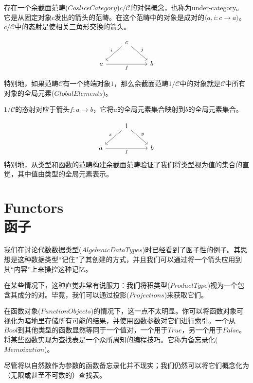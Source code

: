 \documentclass[DaoFP]{subfiles}
\begin{document}
    存在一个余截面范畴($Coslice Category$)$c / \mathcal{C}$的对偶概念，也称为under-category。它是从固定对象$c$发出的箭头的范畴。在这个范畴中的对象是成对的$\langle a, i \colon c \to a \rangle$。$c / \mathcal{C}$中的态射是使相关三角形交换的箭头。

    \[
        \begin{tikzcd}
            & c
            \arrow[rd, "j"]
            \arrow[ld, "i"']
            \\
            a
            \arrow[rr, "f"']
            && b
        \end{tikzcd}
    \]

    特别地，如果范畴$\mathcal{C}$有一个终端对象$1$，那么余截面范畴$1 / \mathcal{C}$中的对象就是$\mathcal{C}$中所有对象的全局元素($Global Elements$)。

    $1/  \mathcal{C}$的态射对应于箭头$f \colon a \to b$，它将$a$的全局元素集合映射到$b$的全局元素集合。

    \[
        \begin{tikzcd}
            & 1
            \arrow[rd, "y"]
            \arrow[ld, "x"']
            \\
            a
            \arrow[rr, "f"']
            && b
        \end{tikzcd}
    \]
    特别地，从类型和函数的范畴构建余截面范畴验证了我们将类型视为值的集合的直觉，其中值由类型的全局元素表示。

    \section{Functors\\函子}

    我们在讨论代数数据类型($Algebraic Data Types$)时已经看到了函子性的例子。其思想是这种数据类型“记住”了其创建的方式，并且我们可以通过将一个箭头应用到其“内容”上来操控这种记忆。

    在某些情况下，这种直觉非常有说服力：我们将积类型($Product Type$)视为一个包含其成分的对。毕竟，我们可以通过投影($Projections$)来获取它们。

    在函数对象($Function Objects$)的情况下，这一点不太明显。你可以将函数对象可视化为暗地里存储所有可能的结果，并使用函数参数对它们进行索引。一个从$Bool$到其他类型的函数显然等同于一个值对，一个用于$True$，另一个用于$False$。将某些函数实现为查找表是一个众所周知的编程技巧。它称为备忘录化($Memoization$)。

    尽管将以自然数作为参数的函数备忘录化并不现实；我们仍然可以将它们概念化为（无限或甚至不可数的）查找表。
\end{document}
